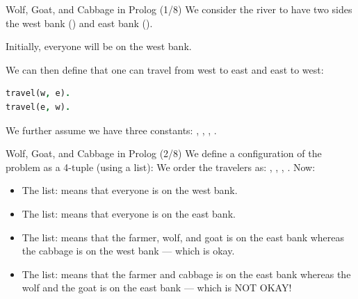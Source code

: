 \begin{frame}[fragile]{Wolf, Goat, and Cabbage in Prolog (1/8)}
We consider the river to have two sides the west bank () and east bank
().

Initially, everyone will be on the west bank.

We can then define that one can travel from west to east and east to west:

\begin{lstlisting}[language=prolog, xleftmargin=0.5cm]
travel(w, e). 
travel(e, w).
\end{lstlisting}

We further assume we have three constants: , ,
, .
\end{frame}


\begin{frame}[fragile]{Wolf, Goat, and Cabbage in Prolog (2/8)}
We define a configuration of the problem as a 4-tuple (using a list):
%
We order the travelers as: , , ,
. Now:
%
\begin{itemize}
    \item The list: \Code{[w, w, w, w]} means that everyone is on the west bank.
    \item The list: \Code{[e, e, e, e]} means that everyone is on the east bank.
    \item The list: \Code{[e, e, e, w]} means that the farmer, wolf, and goat is
    on the east bank whereas the cabbage is on the west bank --- which is okay.
    \item The list: \Code{[e, w, w, e]} means that the farmer and cabbage is on
    the east bank whereas the wolf and the goat is on the east bank --- which is
    NOT OKAY!
\end{itemize}
\end{frame}
   
